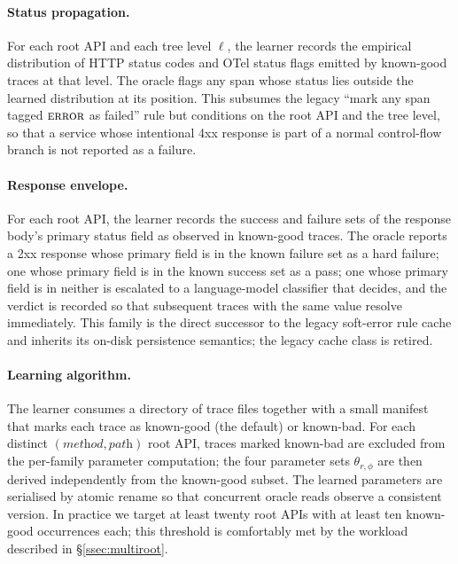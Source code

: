 \documentclass[conference]{IEEEtran}
\begin{document}
\paragraph{Status propagation.}
For each root API and each tree level $\ell$, the learner records the empirical distribution of HTTP status codes and OTel status flags emitted by known-good traces at that level. The oracle flags any span whose status lies outside the learned distribution at its position. This subsumes the legacy ``mark any span tagged $\textsc{error}$ as failed'' rule but conditions on the root API and the tree level, so that a service whose intentional 4xx response is part of a normal control-flow branch is not reported as a failure.

\paragraph{Response envelope.}
For each root API, the learner records the success and failure sets of the response body's primary status field as observed in known-good traces. The oracle reports a 2xx response whose primary field is in the known failure set as a hard failure; one whose primary field is in the known success set as a pass; one whose primary field is in neither is escalated to a language-model classifier that decides, and the verdict is recorded so that subsequent traces with the same value resolve immediately. This family is the direct successor to the legacy soft-error rule cache and inherits its on-disk persistence semantics; the legacy cache class is retired.

\paragraph{Learning algorithm.}
The learner consumes a directory of trace files together with a small manifest that marks each trace as known-good (the default) or known-bad. For each distinct $(\textit{method}, \textit{path})$ root API, traces marked known-bad are excluded from the per-family parameter computation; the four parameter sets $\theta_{r,\phi}$ are then derived independently from the known-good subset. The learned parameters are serialised by atomic rename so that concurrent oracle reads observe a consistent version. In practice we target at least twenty root APIs with at least ten known-good occurrences each; this threshold is comfortably met by the workload described in \S\ref{ssec:multiroot}.
\end{document}
